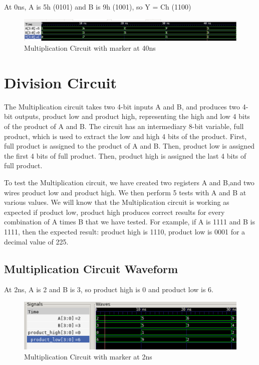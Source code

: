 \documentclass[12pt]{article}
\begin{document}
 At 0ns, A is 5h (0101) and B is 9h (1001), so Y = Ch (1100)  
 \begin{figure}[H]
 \centering 
\includegraphics[width = 1.0\textwidth]{Subtraction/Subtraction-40ns.png}
 \caption{Multiplication Circuit with marker at 40ns}
 \label{fig:enter-label}
 \end{figure}

 \section{Division Circuit}
 The Multiplication circuit takes two 4-bit inputs A and B, and produces two 4-bit outputs, product low and product high, representing the high and low 4 bits of the product of A and B. The circuit has an intermediary 8-bit variable, full product, which is used to extract the low and high 4 bits of the product. First, full product is assigned to the product of A and B. Then, product low is assigned the first 4 bits of full product. Then, product high is assigned the last 4 bits of full product. 
  
 
 To test the Multiplication circuit, we have created two registers A and B,and two wires product low and product high. We then perform 5 tests with A and B at various values. We will know that the Multiplication circuit is working as expected if product low, product high produces correct results for every combination of A times B that we have tested. For example, if A is 1111 and B is 1111, then the expected result: product high is 1110, product low is 0001 for a decimal value of 225.
 
 \subsection{Multiplication Circuit Waveform} 
 
 At 2ns, A is 2 and B is 3, so product high is 0 and product low is 6.  
 \begin{figure}[H]
  \centering
  \includegraphics[width = 1.0\textwidth]{Multiplication/multiplication_wave.png}
  \caption{Multiplication Circuit with marker at 2ns}
  \label{fig:enter-label} 
 \end{figure} 
 
\end{document}
